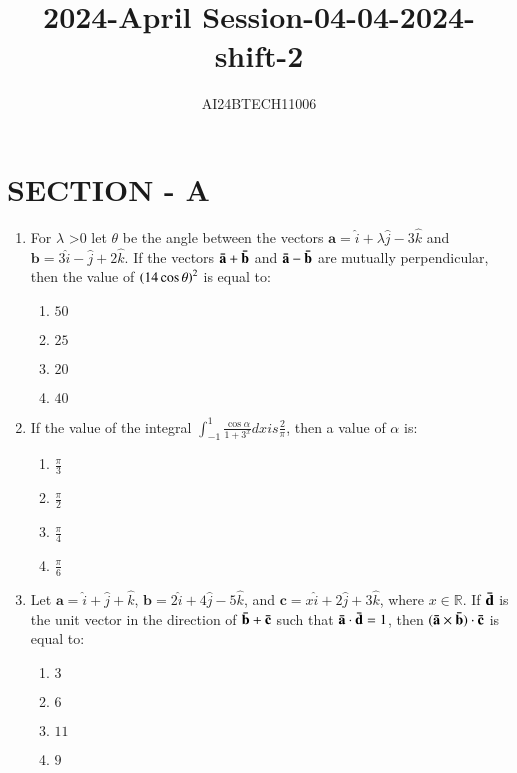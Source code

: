 \documentclass[journal,12pt,twocolumn]{IEEEtran}
\theoremstyle{remark}
\begin{document}

\vspace{3cm}
\title{2024-April Session-04-04-2024-shift-2}
\author{AI24BTECH11006}
\maketitle
\section{SECTION - A}
\begin{enumerate}[start=16]
\item For $\lambda$ \textgreater $ 0$ let $\theta$ be the angle between the vectors $\mathbf{a} = \hat{i} + \lambda \hat{j} - 3 \hat{k}$ and $\mathbf{b} = 3 \hat{i} - \hat{j} + 2 \hat{k}$. If the vectors $\mathbf{\Bar{a}} + \mathbf{\Bar{b}}$ and $\mathbf{\Bar{a}} - \mathbf{\Bar{b}}$ are mutually perpendicular, then the value of $\left(14 \cos \theta\right)^2$ is equal to:
    \hfill{}
	\begin{enumerate}
        \item $50$
        \item $25$
        \item $20$
        \item $40$
    \end{enumerate}

    \item If the value of the integral $\int_{-1}^{1} \frac{\cos \alpha}{1 + 3^x}dx is \frac{2}{\pi}$, then a value of $\alpha$ is:
    \hfill{}
	    \begin{enumerate}
        \item $\frac{\pi}{3}$
        \item $\frac{\pi}{2}$
        \item $\frac{\pi}{4}$
        \item $\frac{\pi}{6}$
    \end{enumerate}

    \item Let $\mathbf{a} = \hat{i} + \hat{j} + \hat{k}$, $\mathbf{b} = 2 \hat{i} + 4 \hat{j} - 5 \hat{k}$, and $\mathbf{c} = x \hat{i} + 2 \hat{j} + 3 \hat{k}$, where $x \in \mathbb{R}$. If $\mathbf{\Bar{d}}$ is the unit vector in the direction of $\mathbf{\Bar{b}} + \mathbf{\Bar{c}}$ such that $\mathbf{\Bar{a}} \cdot \mathbf{\Bar{d}} = 1$, then $(\mathbf{\Bar{a}} \times \mathbf{\Bar{b}}) \cdot \mathbf{\Bar{c}}$ is equal to:
    \hfill{}
	    \begin{enumerate}
        \item $3$
        \item $6$
        \item $11$
        \item $9$
    \end{enumerate}


\end{enumerate}
\end{document}
